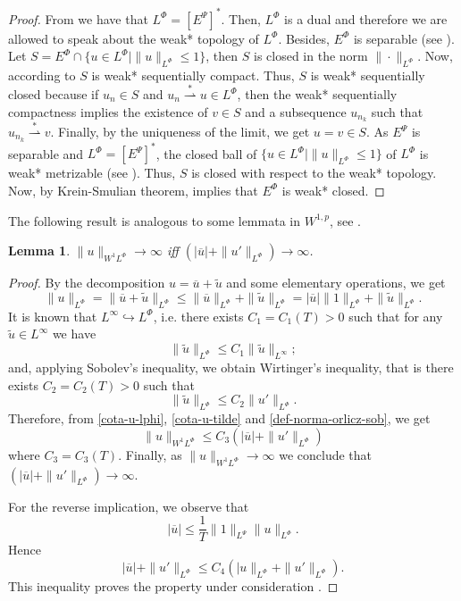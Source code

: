 \documentclass[twoside]{article}
\newtheorem{lem}[thm]{Lemma}
\theoremstyle{remark}
\newcommand{\orlnor}{\|_{L^{\Phi}}}
\newcommand{\lphi}{L^{\Phi}}
\newcommand{\lpsi}{L^{\Psi}}
\newcommand{\ephi}{E^{\Phi}}
\newcommand{\sobnor}{\|_{W^{1}\lphi}}
\renewcommand{\leq}{\leqslant}
\newcommand{\epsi}{E^{\Psi}}
\begin{document}
\begin{proof}
From \cite[Thm. 7, p. 110]{rao1991theory} we have that $\lphi=\left[\epsi\right]^*
$.
Then, $\lphi$ is a dual and therefore we are allowed to speak about the weak* topology of $\lphi$.
Besides, $\ephi
$ is separable (see \cite[Thm. 1, p. 87]{rao1991theory}).
Let $S=\ephi\cap \{u \in \lphi|\|u\orlnor\leq 1\}$, then $S$ is closed in the norm $\|\cdot\orlnor$. 
Now, according to \cite[Cor. 5, p. 148]{rao1991theory} $S$ is weak* sequentially compact. 
Thus, $S$ is weak* sequentially closed because if $u_n\in S$ and
$u_n \overset{*}{\rightharpoonup}u \in \lphi$, then  the weak* sequentially compactness implies the existence of $v \in S$ and a subsequence $u_{n_k}$ such that
$u_{n_k}\overset{*}{\rightharpoonup}v$. Finally, by the uniqueness of   the limit, we get
$u=v\in S$.
As $\epsi$ is separable and $\lphi=\left[\epsi\right]^*$, the closed ball of $\{u \in \lphi | \|u\orlnor\leq 1\}$ of $\lphi$  is  weak* metrizable (see \cite[Thm. 5.1, p. 138]{Conway1977}).
Thus, $S$ is closed with respect to  the weak* topology. Now, by  Krein-Smulian theorem, \cite[Cor. 12.6, p. 165]{Conway1977} implies that $\ephi$ is weak* closed.
\end{proof}

The following result is analogous to some lemmata in $W^{1,p}$, see \cite[Lem. 1]{xu2007some}.
\begin{lem}\label{infinito-a-prom-upunto}
 $\|u\sobnor\to \infty$ iff  $(|\overline{u}|+\|u'\orlnor)\to \infty$.
\end{lem}

\begin{proof}
By the decomposition $u=\overline{u}+\tilde{u}$ and some elementary operations,
we get
\begin{equation}\label{cota-u-lphi}
\|u\orlnor=
\|\overline{u}+\tilde{u}\orlnor\leq
\|\overline{u}\orlnor+\|\tilde{u}\orlnor=
|\overline{u}|\|1\orlnor+\|\tilde{u}\orlnor.
\end{equation}
It is known that $L^{\infty}\hookrightarrow\lphi$, i.e.
there exists $C_1=C_1(T)>0$ such that for any $\tilde{u}\in L^{\infty}$ we have
\[
\|\tilde{u}\orlnor
\leq
C_1 \|\tilde{u}\|_{L^{\infty}};
\]
and, applying  Sobolev's inequality,  we obtain Wirtinger's inequality, 
that is there exists $C_2=C_2(T)>0$ such that
\begin{equation}\label{cota-u-tilde}
\|\tilde{u}\orlnor
\leq
C_2\|u'\orlnor.
\end{equation}
Therefore, from \eqref{cota-u-lphi}, \eqref{cota-u-tilde} and \eqref{def-norma-orlicz-sob},
we get
\[
\|u\sobnor\leq
C_3(|\overline{u}|+\|u'\orlnor)
\]
where $C_3=C_3(T)$. Finally, as $\|u\sobnor\to \infty$ we conclude that
$(|\overline{u}|+\|u'\orlnor)\to \infty$.

For the reverse implication, we observe that
\[|\overline{u}|\leq \frac{1}{T}\|1\|_{\lpsi}\|u\orlnor.\]
Hence
\[|\overline{u}| +\|u'\orlnor\leq C_4(|u\orlnor +\|u'\orlnor).\]
 This inequality proves the property under consideration
.\end{proof}
\end{document}
